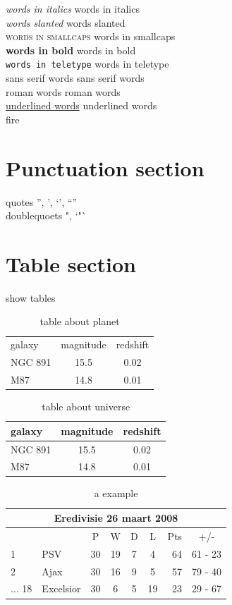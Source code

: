 \documentclass{article}
\begin{document}
\noindent
\textit{words in italics} words in italics\\
\textsl{words slanted} words slanted\\
\textsc{words in smallcaps} words in smallcaps\\
\textbf{words in bold} words in bold\\
\texttt{words in teletype} words in teletype\\
\textsf{sans serif words} sans serif words\\
\textrm{roman words} roman words\\
\underline{underlined words} underlined words\\

\noindent
{\color{red}fire}

{\section{Punctuation section}}
quotes '', ', `', ``''\\
doublequoets ", `"`


{\section{Table section}}
show tables
\begin{table}[h]
  \centering
  \begin{tabular}{lcc}
    galaxy & magnitude & redshift \\
    NGC 891 & 15.5 & 0.02 \\
    M87 & 14.8 & 0.01		
  \end{tabular}
  \caption{table about planet}
  \label{tab-withoud-line}	
\end{table}


\begin{table}[h]
  \centering
  \begin{tabular}{|l|c|c|}
    galaxy & magnitude & redshift \\
    \hline
    NGC 891 & 15.5 & 0.02 \\
    \cline{2-3}
    M87 & 14.8 & 0.01		
  \end{tabular}
  \caption{table about universe}
  \label{tab-with-line}	
\end{table}

\begin{table}[h]
  \caption{a example}
  \label{tab-with-multicolumn}
  \centering
  \begin{tabular}{|l|l|cccc|r|c|}
    \hline
    \multicolumn{8}{|c|}{Eredivisie 26 maart 2008} \\
    \hline
    & & P & W & D & L & Pts & +/- \\
    \hline
    1 & PSV & 30 & 19 & 7 & 4 & 64 & 61 - 23 \\
    2 & Ajax & 30 & 16 & 9 & 5 & 57 & 79 - 40 \\
    ...
    18 & Excelsior & 30 & 6 & 5 & 19 & 23 & 29 - 67 \\
    \hline
    \end{tabular}
\end{table}
\end{document}
